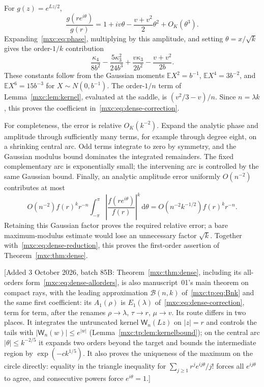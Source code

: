 \documentclass[11pt]{article}
\numberwithin{equation}{section}
\theoremstyle{definition}
\theoremstyle{remark}
\newcommand{\E}{\mathbb E}
\newcommand{\dd}{\,\mathrm d}
\begin{document}
For $g(z)=e^{Lz/2}$,
\[
 \frac{g(r e^{i\theta})}{g(r)}
 =1+i v\theta-\frac{v+v^2}{2}\theta^2+O_K(\theta^3).
\]
Expanding~\eqref{mxc:eq:phase}, multiplying by this amplitude, and setting
$\theta=x/\sqrt{k}$ gives the order-$1/k$ contribution
\[
 \frac{\kappa_4}{8b^2}-\frac{5\kappa_3^2}{24b^3}
 +\frac{v\kappa_3}{2b^2}-\frac{v+v^2}{2b}.
\]
These constants follow from the Gaussian moments
$\E X^2=b^{-1}$, $\E X^4=3b^{-2}$, and
$\E X^6=15b^{-3}$ for $X\sim N(0,b^{-1})$.
The order-$1/n$ term of Lemma~\ref{mxc:lem:kernel}, evaluated at the
saddle, is $(v^2/3-v)/n$. Since $n=\lambda k$, this proves the
coefficient in~\eqref{mxc:eq:dense-correction}.

For completeness, the error is relative $O_K(k^{-2})$. Expand the
analytic phase and amplitude through sufficiently many terms, for
example through degree eight, on a shrinking central arc. Odd
terms integrate to zero by symmetry, and the Gaussian modulus bound
dominates the integrated remainders. The fixed complementary arc is
exponentially small; the intervening arc is controlled by the same
Gaussian bound. Finally, an analytic amplitude error uniformly
$O(n^{-2})$ contributes at most
\[
 O(n^{-2})f(r)^k r^{-n}
    \int_{-\pi}^{\pi}\left|\frac{f(r e^{i\theta})}{f(r)}\right|^k
       \dd\theta
 =O(n^{-2}k^{-1/2})f(r)^k r^{-n}.
\]
Retaining this Gaussian factor proves the required relative error;
a bare maximum-modulus estimate would lose an unnecessary factor
$\sqrt k$. Together with~\eqref{mxc:eq:dense-reduction}, this proves
the first-order assertion of Theorem~\ref{mxc:thm:dense}.

[Added 3 October 2026, batch 85B: Theorem~\ref{mxc:thm:dense}, including
its all-orders form~\eqref{mxc:eq:dense-allorders}, is also manuscript~01's
main theorem on compact rays, with the leading approximation
$\mathcal B(n,k)$ of~\eqref{mxc:tp:eq:Bnk} and the same first coefficient:
its $A_1(\rho)$ is $E_1(\lambda)$ of~\eqref{mxc:eq:dense-correction}, term
for term, after the renames $\rho\to\lambda$, $\tau\to r$, $\mu\to v$.
Its route differs in two places. It integrates the untruncated kernel
$\mathsf W_n(Lz)$ on $|z|=r$ and controls the tails with
$|\mathsf W_n(w)|\le e^{|w|}$ (Lemma~\ref{mxc:tp:lem:kernelbound}); on the
central arc $|\theta|\le k^{-2/5}$ it expands two orders beyond the target
and bounds the intermediate region by $\exp(-ck^{1/5})$. It also proves the
uniqueness of the maximum on the circle directly: equality in the triangle
inequality for $\sum_{j\ge1}r^je^{ij\theta}/j!$ forces all $e^{ij\theta}$
to agree, and consecutive powers force $e^{i\theta}=1$.]
\end{document}
